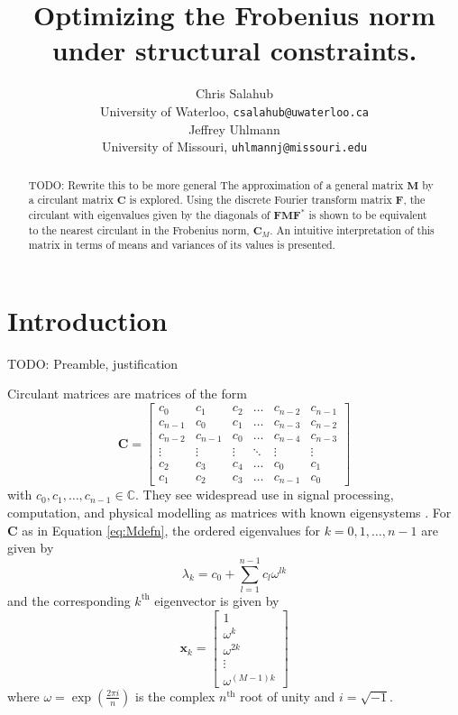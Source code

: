 \documentclass[letterpaper,12pt,oneside,final]{article}
\title{Optimizing the Frobenius norm under structural constraints.}
\author{Chris Salahub \\ {\footnotesize University of Waterloo,
    \texttt{csalahub@uwaterloo.ca}} \\
Jeffrey Uhlmann \\ {\footnotesize University of Missouri, \texttt{uhlmannj@missouri.edu}}}
\newcommand{\ve}[1]{\mathbf{#1}}           %
\newcommand{\m}[1]{\mathbf{#1}}               %
\newcommand{\conj}[1]{{#1}^{\ast}}
\newcommand{\field}[1]{\mathbb{#1}}
\newcommand{\Complex}{\field{C}}
\newcommand{\TODO}[1]{{\color{brickred} TODO:  {#1}}}
\begin{document}
\maketitle

\begin{abstract} \TODO{Rewrite this to be more general}
  The approximation of a general matrix $\m{M}$ by a circulant matrix $\m{C}$ is explored. Using the discrete Fourier transform matrix $\m{F}$, the circulant with eigenvalues given by the diagonals of $\m{F} \m{M} \conj{\m{F}}$ is shown to be equivalent to the nearest circulant in the Frobenius norm, $\m{C}_M$. An intuitive interpretation of this matrix in terms of means and variances of its values is presented.
\end{abstract}

\section{Introduction}

\TODO{Preamble, justification}

Circulant matrices are matrices of the form
\begin{equation} \label{eq:circdefn}
  \m{C} = \begin{bmatrix}
    c_{0} & c_{1} & c_{2} & \dots & c_{n-2} & c_{n-1} \\
    c_{n-1} & c_{0} & c_{1} & \dots & c_{n-3} & c_{n-2} \\
    c_{n-2} & c_{n-1} & c_{0} & \dots & c_{n-4} & c_{n-3} \\
    \vdots & \vdots & \vdots & \ddots & \vdots & \vdots \\
    c_{2} & c_{3} & c_{4} & \dots & c_{0} & c_{1} \\
    c_{1} & c_{2} & c_{3} & \dots & c_{n-1} & c_{0}
  \end{bmatrix}
\end{equation}
with $c_0, c_1, \dots, c_{n-1} \in \Complex$. They see widespread use in signal processing, computation, and physical modelling as matrices with known eigensystems \cite{chan1988optimal,gray2006toeplitz}. For $\m{C}$ as in Equation \ref{eq:Mdefn}, the ordered eigenvalues for $k = 0, 1, \dots, n-1$ are given by
\begin{equation} \label{eq:circevals}
  \lambda_k = c_0 + \sum_{l = 1}^{n-1} c_l \omega^{lk}
\end{equation}
and the corresponding $k^{\text{th}}$ eigenvector is given by
\begin{equation} \label{eq:circevecs}
  \ve{x}_k = \begin{bmatrix}
  1 \\
  \omega^k \\
  \omega^{2k} \\
  \vdots \\
  \omega^{(M-1)k}
\end{bmatrix}
\end{equation}
where $\omega = \exp (\frac{2 \pi i}{n})$ is the complex $n^{\text{th}}$ root of unity and $i = \sqrt{-1}$.
\end{document}
